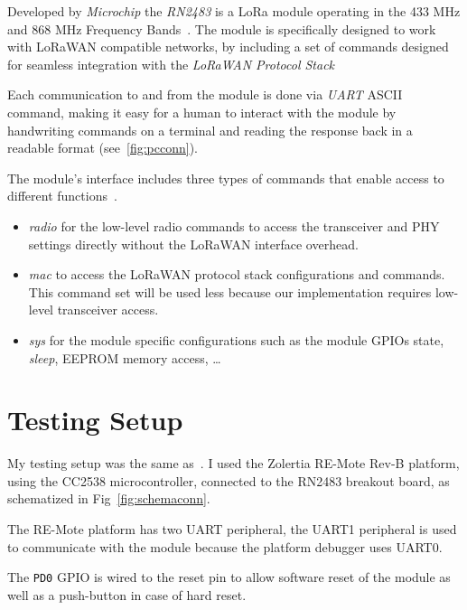 Developed by \emph{Microchip} the \emph{RN2483} is a LoRa module operating in
the 433 MHz and 868 MHz Frequency Bands~\cite{microchip:rn2483}. 
The module is specifically designed to work with LoRaWAN compatible networks, 
by including a set of commands designed for seamless integration with the
\emph{LoRaWAN Protocol Stack}

Each communication to and from the module is done via \emph{UART} ASCII command,
making it easy for a human to interact with the module by handwriting commands
on a terminal and reading the response back in a readable format
(see~\ref{fig:pcconn}).



The module's interface includes three types of commands that enable access to
different functions~\cite{microchip:reference}.

\begin{itemize}
  \item \emph{radio} for the low-level radio commands to access the transceiver
    and PHY settings directly without the LoRaWAN interface overhead.
  \item \emph{mac} to access the LoRaWAN protocol stack configurations and
    commands. This command set will be used less because our implementation
    requires low-level transceiver access.
  \item \emph{sys} for the module specific configurations such as the module
    GPIOs state, \emph{sleep}, EEPROM memory access, \ldots
\end{itemize}

\section{Testing Setup}

My testing setup was the same as~\cite{8847137}. I used the Zolertia RE-Mote
Rev-B platform, using the CC2538 microcontroller, connected to the
RN2483 breakout board, as schematized in Fig~\ref{fig:schemaconn}. 

The RE-Mote platform has two UART peripheral, the UART1 peripheral is used
to communicate with the module because the platform debugger uses UART0.

The \lstinline{PD0} GPIO is wired to the reset pin to allow
software reset of the module as well as a push-button in case of hard reset.

